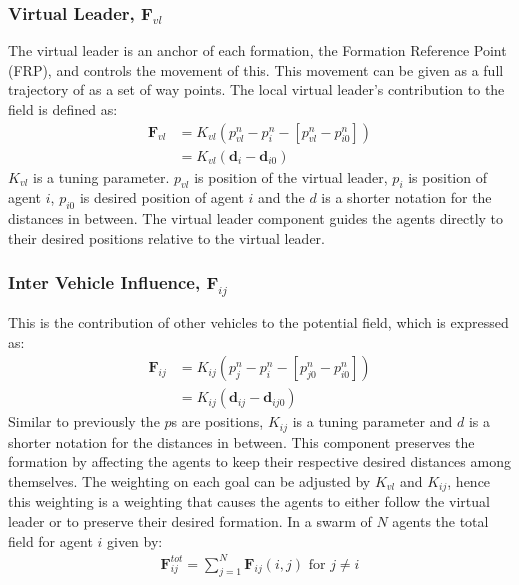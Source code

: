 \documentclass[a4paper,conference]{IEEEtran}
\begin{document}
\subsubsection{Virtual Leader, $\mathbf{F}_{vl}$}
The virtual leader is an anchor of each formation, the Formation Reference Point (FRP), and
controls the movement of this. This movement can be given as a
full trajectory of as a set of way points. The local virtual leader's
contribution to the field is defined as:
\begin{align}
\mathbf{F}_{vl} &= K_{vl}(p_{vl}^n-p_i^n-[p_{vl}^n-p_{i0}^n])\\
&= K_{vl}(\mathbf{d}_i-\mathbf{d}_{i0})
\end{align}
$K_{vl}$ is a tuning parameter. $p_{vl}$ is position of the virtual
leader, $p_i$ is position of agent $i$, $p_{i0}$ is desired position
of agent $i$ and the $d$ is a shorter notation for the distances in
between. The virtual leader component guides the agents directly to
their desired positions relative to the virtual leader.

\subsubsection{Inter Vehicle Influence, $\mathbf{F}_{ij}$}
This is the contribution of other vehicles to the potential field,
which is expressed as:
\begin{align}
\mathbf{F}_{ij} &= K_{ij}(p_{j}^n-p_i^n-[p_{j0}^n-p_{i0}^n])\\
&= K_{ij}(\mathbf{d}_{ij}-\mathbf{d}_{ij0})
\end{align}
Similar to previously the $p$s are positions, $K_{ij}$ is a tuning
parameter and $d$ is a shorter notation for the distances in between.
This component preserves the formation by affecting the agents to keep
their respective desired distances among themselves. The weighting on
each goal can be adjusted by $K_{vl}$ and $K_{ij}$, hence this
weighting is a weighting that causes the agents to either follow the
virtual leader or to preserve their desired formation.  In a swarm of
$N$ agents the total field for agent $i$ given by:
\begin{align}
\mathbf{F}_{ij}^{tot} = \sum\limits_{j=1}^N\mathbf{F}_{ij}(i,j) \text{ for } j\neq i
\end{align}
\end{document}
